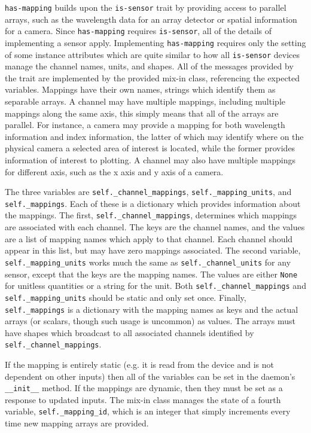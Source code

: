 \texttt{has-mapping} builds upon the \texttt{is-sensor} trait by providing access to parallel arrays, such as the wavelength data for an array detector or spatial information for a camera.
Since \texttt{has-mapping} requires \texttt{is-sensor}, all of the details of implementing a sensor apply.
Implementing \texttt{has-mapping} requires only the setting of some instance attributes which are quite similar to how all \texttt{is-sensor} devices manage the channel names, units, and shapes.
All of the messages provided by the trait are implemented by the provided mix-in class, referencing the expected variables.
Mappings have their own names, strings which identify them as separable arrays.
A channel may have multiple mappings, including multiple mappings along the same axis, this simply means that all of the arrays are parallel.
For instance, a camera may provide a mapping for both wavelength information and index information, the latter of which may identify where on the physical camera a selected area of interest is located, while the former provides information of interest to plotting.
A channel may also have multiple mappings for different axis, such as the x axis and y axis of a camera.

The three variables are \texttt{self.\_channel\_mappings}, \texttt{self.\_mapping\_units}, and \texttt{self.\_mappings}.
Each of these is a dictionary which provides information about the mappings.
The first, \texttt{self.\_channel\_mappings}, determines which mappings are associated with each channel.
The keys are the channel names, and the values are a list of mapping names which apply to that channel.
Each channel should appear in this list, but may have zero mappings associated.
The second variable, \texttt{self.\_mapping\_units} works much the same as \texttt{self.\_channel\_units} for any sensor, except that the keys are the mapping names.
The values are either \texttt{None} for unitless quantities or a string for the unit.
Both \texttt{self.\_channel\_mappings} and \texttt{self.\_mapping\_units} should be static and only set once.
Finally, \texttt{self.\_mappings} is a dictionary with the mapping names as keys and the actual arrays (or scalars, though such usage is uncommon) as values.
The arrays must have shapes which broadcast to all associated channels identified by \texttt{self.\_channel\_mappings}.

If the mapping is entirely static (e.g. it is read from the device and is not dependent on other inputs) then all of the variables can be set in the daemon's \texttt{\_\_init\_\_} method.
If the mappings are dynamic, then they must be set as a response to updated inputs.
The mix-in class manages the state of a fourth variable, \texttt{self.\_mapping\_id}, which is an integer that simply increments every time new mapping arrays are provided.

